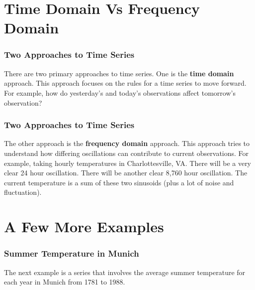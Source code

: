 \documentclass[%
xcolor=pdftex]{beamer}
\begin{document}

\section{Time Domain Vs Frequency Domain}
\frame{\tableofcontents[currentsection]}

\begin{frame}
\frametitle{Two Approaches to Time Series}
There are two primary approaches to time series.  One is the \textbf{time domain} approach.  This approach focuses on the rules for a time series to move forward. For example, how do yesterday's and today's observations affect tomorrow's observation?
\end{frame}

\begin{frame}
\frametitle{Two Approaches to Time Series}
The other approach is the \textbf{frequency domain} approach.  This approach tries to understand how differing oscillations can contribute to current observations. For example, taking hourly temperatures in Charlottesville, VA. There will be a very clear 24 hour oscillation.  There will be another clear 8,760 hour oscillation. The current temperature is a sum of these two sinusoids (plus a lot of noise and fluctuation).
\end{frame}

\section{A Few More Examples}
\frame{\tableofcontents[currentsection]}

\begin{frame}
\frametitle{Summer Temperature in Munich}

The next example is a series that involves the average summer temperature for each year in Munich from 1781 to 1988.
\end{frame}
\end{document}
